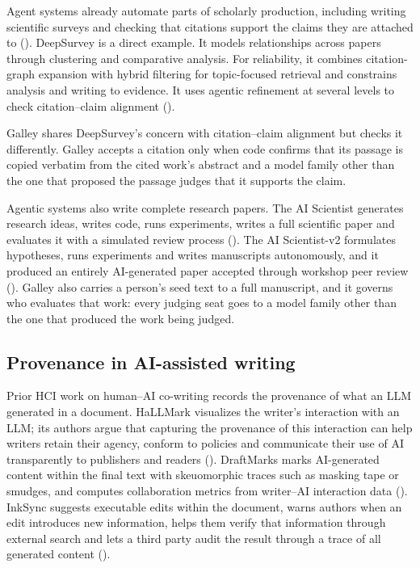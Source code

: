 \documentclass[
]{article}
\begin{document}
Agent systems already automate parts of scholarly production, including
writing scientific surveys and checking that citations support the
claims they are attached to (). DeepSurvey is a direct example. It models relationships
across papers through clustering and comparative analysis. For
reliability, it combines citation-graph expansion with hybrid filtering
for topic-focused retrieval and constrains analysis and writing to
evidence. It uses agentic refinement at several levels to check
citation--claim alignment ().

Galley shares DeepSurvey's concern with citation--claim alignment but
checks it differently. Galley accepts a citation only when code confirms
that its passage is copied verbatim from the cited work's abstract and a
model family other than the one that proposed the passage judges that it
supports the claim.

Agentic systems also write complete research papers. The AI Scientist
generates research ideas, writes code, runs experiments, writes a full
scientific paper and evaluates it with a simulated review process
(). The AI Scientist-v2
formulates hypotheses, runs experiments and writes manuscripts
autonomously, and it produced an entirely AI-generated paper accepted
through workshop peer review
(). Galley also
carries a person's seed text to a full manuscript, and it governs who
evaluates that work: every judging seat goes to a model family other
than the one that produced the work being judged.

\subsection{Provenance in AI-assisted
writing}\label{provenance-in-ai-assisted-writing}

Prior HCI work on human--AI co-writing records the provenance of what an
LLM generated in a document. HaLLMark visualizes the writer's
interaction with an LLM; its authors argue that capturing the provenance
of this interaction can help writers retain their agency, conform to
policies and communicate their use of AI transparently to publishers and
readers ().
DraftMarks marks AI-generated content within the final text with
skeuomorphic traces such as masking tape or smudges, and computes
collaboration metrics from writer--AI interaction data
(). InkSync
suggests executable edits within the document, warns authors when an
edit introduces new information, helps them verify that information
through external search and lets a third party audit the result through
a trace of all generated content ().
\end{document}
